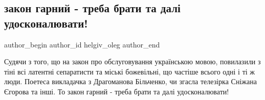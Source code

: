  
 
 
 
 
 
\subsection{закон гарний - треба брати та далі удосконалювати!}
\label{sec:26_01_2021.fb.helgiv_oleg.1.zakon_mova}
 
\ifcmt
 author_begin
   author_id helgiv_oleg
 author_end
\fi

Судячи з того, що на закон про обслуговування українською мовою, повилазили з
тіні всі латентні сепаратисти та міські божевільні, що частіше всього одні і ті
ж люди. Поетеса викладачка з Драгоманова Більченко, чи згасла телезірка Сніжана
Єгорова та інші. То закон гарний - треба брати та далі удосконалювати!

